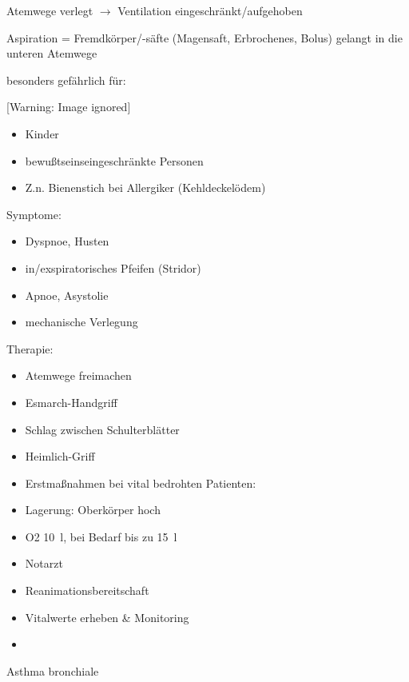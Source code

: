 \documentclass{article}
\begin{document}
Atemwege verlegt ${\rightarrow}$ Ventilation eingeschr\"ankt/aufgehoben

Aspiration = Fremdk\"orper/-s\"afte (Magensaft,
Erbrochenes, Bolus) gelangt in die unteren Atemwege

besonders gef\"ahrlich f\"ur:

\begin{center}
 [Warning: Image ignored] %

\end{center}
\begin{itemize}
\item Kinder

\item bewu{\ss}tseinseingeschr\"ankte Personen

\item Z.n. Bienenstich bei Allergiker (Kehldeckel\"odem)

\end{itemize}
Symptome:

\begin{itemize}
\item Dyspnoe, Husten

\item in/exspiratorisches Pfeifen (Stridor)

\item Apnoe, Asystolie

\item mechanische Verlegung

\end{itemize}
Therapie:

\begin{itemize}
\item Atemwege freimachen

\item Esmarch-Handgriff

\item Schlag zwischen Schulterbl\"atter

\item Heimlich-Griff

\item Erstma{\ss}nahmen bei vital bedrohten Patienten: 

\end{itemize}
\begin{itemize}
\item Lagerung: Oberk\"orper hoch

\item O2 10~l, bei Bedarf bis zu 15~l

\item Notarzt

\item Reanimationsbereitschaft

\end{itemize}
\begin{itemize}
\item Vitalwerte erheben \& Monitoring 

\item \end{itemize}
Asthma bronchiale
\end{document}

